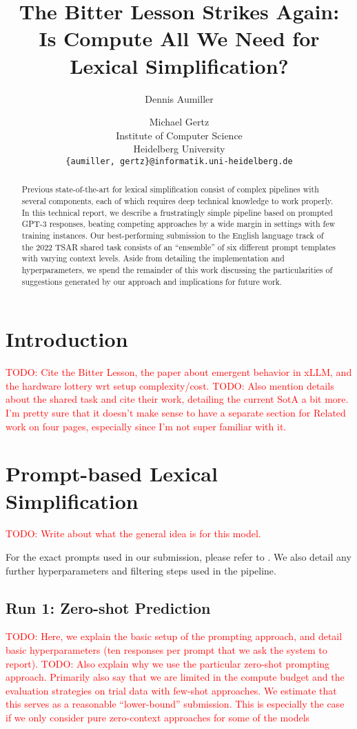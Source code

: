 \documentclass[11pt]{article}
\title{The Bitter Lesson Strikes Again:\\ Is Compute All We Need for Lexical Simplification?}
\author{Dennis Aumiller \and Michael Gertz \\
  Institute of Computer Science \\
  Heidelberg University \\
  \texttt{\{aumiller, gertz\}@informatik.uni-heidelberg.de}}
\newcommand{\todo}[1]{\textcolor{red}{TODO: #1}}
\begin{document}
\maketitle
\begin{abstract}
Previous state-of-the-art for lexical simplification consist of complex pipelines with several components, each of which requires deep technical knowledge to work properly.
In this technical report, we describe a frustratingly simple pipeline based on prompted GPT-3 responses, beating competing approaches by a wide margin in settings with few training instances.
Our best-performing submission to the English language track of the 2022 TSAR shared task consists of an ``ensemble'' of six different prompt templates with varying context levels.
Aside from detailing the implementation and hyperparameters, we spend the remainder of this work discussing the particularities of suggestions generated by our approach and implications for future work.
\end{abstract}

\section{Introduction}
\todo{Cite the Bitter Lesson, the paper about emergent behavior in xLLM, and the hardware lottery wrt setup complexity/cost.}
\todo{Also mention details about the shared task and cite their work, detailing the current SotA a bit more. I'm pretty sure that it doesn't make sense to have a separate section for Related work on four pages, especially since I'm not super familiar with it.}

\section{Prompt-based Lexical Simplification}
\todo{Write about what the general idea is for this model.}

For the exact prompts used in our submission, please refer to . We also detail any further hyperparameters and filtering steps used in the pipeline.

\subsection{Run 1: Zero-shot Prediction}
\todo{Here, we explain the basic setup of the prompting approach, and detail basic hyperparameters (ten responses per prompt that we ask the system to report).}
\todo{Also explain why we use the particular zero-shot prompting approach. Primarily also say that we are limited in the compute budget and the evaluation strategies on trial data with few-shot approaches. We estimate that this serves as a reasonable ``lower-bound'' submission. This is especially the case if we only consider pure zero-context approaches for some of the models}
\end{document}
